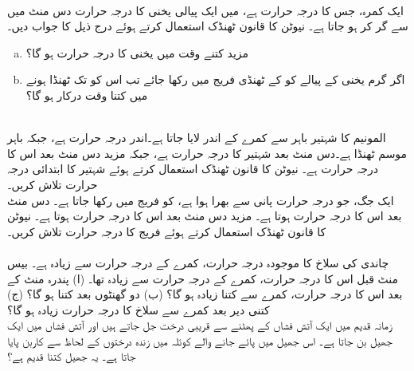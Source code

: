 \\
ایک کمرہ، جس کا درجہ حرارت  ہے،  میں ایک پیالی یخنی کا درجہ حرارت دس منٹ میں  سے گر کر  ہو جاتا  ہے۔ نیوٹن کا قانون ٹھنڈک استعمال کرتے ہوئے درج ذیل کا جواب دیں۔
\begin{enumerate}[a.]
\item
مزید کتنے وقت میں یخنی کا درجہ حرارت ہو گا؟
\item
اگر  گرم یخنی کے پیالے کو  کے ٹھنڈی فریج میں رکھا جائے تب اس کو  تک ٹھنڈا ہونے میں کتنا وقت درکار ہو گا؟ 
\end{enumerate} 
\\
المونیم کا   شہتیر  باہر سے کمرے کے  اندر لایا جاتا ہے۔اندر  درجہ حرارت  ہے، جبکہ  باہر موسم ٹھنڈا ہے۔دس منٹ بعد شہتیر کا درجہ حرارت  ہے،  جبکہ مزید دس منٹ بعد اس کا درجہ حرارت  ہے۔ نیوٹن کا قانون ٹھنڈک استعمال کرتے ہوئے شہتیر کا ابتدائی درجہ حرارت تلاش کریں۔
\\
ایک جگ،  جو  درجہ حرارت پانی سے بھرا ہوا ہے، کو فریج میں رکھا جاتا ہے۔ دس منٹ بعد اس کا درجہ حرارت  ہوتا ہے۔ مزید دس منٹ بعد اس کا درجہ حرارت  ہوتا ہے۔ نیوٹن کا قانون ٹھنڈک استعمال کرتے ہوئے فریج کا درجہ حرارت تلاش کریں۔\\
\\
چاندی کی  سلاخ کا موجودہ درجہ حرارت، کمرے کے درجہ حرارت سے  زیادہ ہے۔ بیس منٹ قبل  اس کا درجہ حرارت، کمرے کے درجہ حرارت سے  زیادہ تھا۔ (ا) پندرہ منٹ کے بعد اس کا درجہ حرارت، کمرے سے کتنا زیادہ ہو گا؟ (ب) دو گھنٹوں بعد کتنا ہو گا؟ (ج) کتنی دیر بعد کمرے سے سلاخ کا درجہ حرارت  زیادہ ہو گا؟  
\\
زمانہ قدیم میں ایک آتش فشاں کے پھٹنے سے قریبی درخت جل جاتے ہیں اور آتش فشاں میں ایک جھیل بن جاتا ہے۔ اس جھیل میں پائے جانے والے  کوئلہ میں زندہ درختوں کے لحاظ سے   کاربن پایا جاتا ہے۔ یہ جھیل کتنا قدیم ہے؟\\

